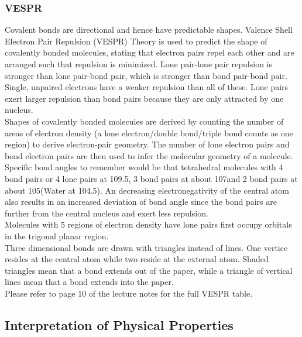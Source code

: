 \documentclass[../main]{subfiles}
\begin{document}
	\subsubsection{VESPR}

	Covalent bonds are directional and hence have predictable shapes. Valence Shell Electron Pair Repulsion (VESPR) Theory is used to predict the shape of covalently bonded molecules, stating that electron pairs repel each other and are arranged such that repulsion is minimized. Lone pair-lone pair repulsion is stronger than lone pair-bond pair, which is stronger than bond pair-bond pair. Single, unpaired electrons have a weaker repulsion than all of these. Lone pairs exert larger repulsion than bond pairs because they are only attracted by one nucleus. \\

	Shapes of covalently bonded molecules are derived by counting the number of areas of electron density (a lone electron/double bond/triple bond counts as one region) to derive electron-pair geometry. The number of lone electron pairs and bond electron pairs are then used to infer the molecular geometry of a molecule. \\

	Specific bond angles to remember would be that tetrahedral molecules with 4 bond pairs or 4 lone pairs at 109.5\degree, 3 bond pairs at about 107\degree and 2 bond pairs at about 105\degree (Water at 104.5\degree). An decreasing electronegativity of the central atom also results in an increased deviation of bond angle since the bond pairs are further from the central nucleus and exert less repulsion. \\

	Molecules with 5 regions of electron density have lone pairs first occupy orbitals in the trigonal planar region. \\

	Three dimensional bonds are drawn with triangles instead of lines. One vertice resides at the central atom while two reside at the external atom. Shaded triangles mean that a bond extends out of the paper, while a triangle of vertical lines mean that a bond extends into the paper. \\

	Please refer to page 10 of the lecture notes for the full VESPR table.

	\subsection{Interpretation of Physical Properties}
\end{document}
